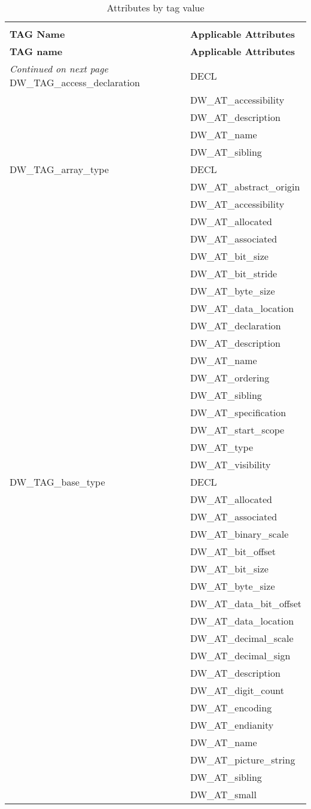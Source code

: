 \label{tab:attributesbytag}
\setlength{\extrarowheight}{0.1cm}
\begin{longtable}{l|p{8cm}}
  \caption{Attributes by tag value} \\
  \hline \\ \bfseries TAG Name&\bfseries Applicable Attributes\\ \hline
\endfirsthead
  \bfseries TAG name&\bfseries Applicable Attributes \\ \hline
\endhead
  \hline \emph{Continued on next page}
\endfoot
  \hline
\endlastfoot
DW\_TAG\_access\_declaration 
& DECL \\
&DW\_AT\_accessibility \\
&DW\_AT\_description \\
&DW\_AT\_name \\
&DW\_AT\_sibling \\

DW\_TAG\_array\_type
&DECL \\
&DW\_AT\_abstract\_origin \\
&DW\_AT\_accessibility \\
&DW\_AT\_allocated \\
&DW\_AT\_associated \\
&DW\_AT\_bit\_size \\
&DW\_AT\_bit\_stride \\
&DW\_AT\_byte\_size \\
&DW\_AT\_data\_location \\
&DW\_AT\_declaration \\
&DW\_AT\_description \\
&DW\_AT\_name \\
&DW\_AT\_ordering \\
&DW\_AT\_sibling \\
&DW\_AT\_specification \\
&DW\_AT\_start\_scope \\
&DW\_AT\_type \\
&DW\_AT\_visibility \\

DW\_TAG\_base\_type
&DECL \\
&DW\_AT\_allocated \\
&DW\_AT\_associated \\
&DW\_AT\_binary\_scale \\
&DW\_AT\_bit\_offset \\
&DW\_AT\_bit\_size \\
&DW\_AT\_byte\_size \\
&DW\_AT\_data\_bit\_offset \\
&DW\_AT\_data\_location \\
&DW\_AT\_decimal\_scale \\
&DW\_AT\_decimal\_sign \\
&DW\_AT\_description \\
&DW\_AT\_digit\_count \\
&DW\_AT\_encoding \\
&DW\_AT\_endianity \\
&DW\_AT\_name \\
&DW\_AT\_picture\_string \\
&DW\_AT\_sibling \\
&DW\_AT\_small \\


\end{longtable}
